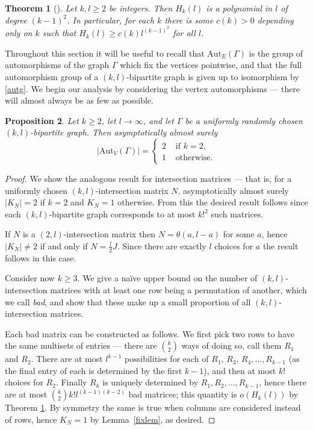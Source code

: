 \documentclass{daj}
\newcommand\Aut{\mathrm{Aut}}
\theoremstyle{plain}
\newtheorem{theorem}{Theorem}[section]
\newtheorem{proposition}[theorem]{Proposition}
\theoremstyle{definition}
\begin{document}
\begin{theorem}[\cite{stanley}]\label{iklsize}
Let $k,l\geq2$ be integers. Then $H_k(l)$ is a polynomial in $l$ of degree $(k-1)^2$. In particular, for each $k$ there is some $c(k)>0$ depending only on $k$ such that $H_{k}(l)\geq c(k)l^{(k-1)^2}$ for all $l$.
\end{theorem}
Throughout this section it will be useful to recall that $\Aut_E(\Gamma)$ is the group of automorphisms of the graph $\Gamma$ which fix the vertices pointwise, and that the full automorphism group of a $(k,l)$-bipartite graph is given up to isomorphism by \eqref{autg}. We begin our analysis by considering the vertex automorphisms --- there will almost always be as few as possible.
\begin{proposition}\label{trivverts}
Let $k\geq 2$, let $l\to\infty$, and let $\Gamma$ be a uniformly randomly chosen $(k,l)$-bipartite graph. Then asymptotically almost surely $$|\Aut_V(\Gamma)|=\begin{cases}2&\text{ if $k=2$,}\\
1&\text{ otherwise.}\end{cases}$$
\end{proposition}
\begin{proof}
We show the analogous result for intersection matrices --- that is, for a uniformly chosen $(k,l)$-intersection matrix $N$, asymptotically almost surely $|K_N|=2$ if $k=2$ and $K_N=1$ otherwise. From this the desired result follows since each $(k,l)$-bipartite graph corresponds to at most $k!^2$ such matrices. 

If $N$ is a $(2,l)$-intersection matrix then $N=\theta(a,l-a)$ for some $a$, hence $|K_N|\ne 2$ if and only if $N=\frac{l}{2}J$. Since there are exactly $l$ choices for $a$ the result follows in this case. 


Consider now $k\geq 3$. We give a na\"ive upper bound on the number of $(k,l)$-intersection matrices with at least one row being a permutation of another, which we call \emph{bad}, and show that these make up a small proportion of all $(k,l)$-intersection matrices.

Each bad matrix can be constructed as follows. We first pick two rows to have the same multisets of entries --- there are ${k\choose 2}$ ways of doing so, call them $R_1$ and $R_2$. There are at most $l^{k-1}$ possibilities for each of $R_1$, $R_3$, $R_4,\dots, R_{k-1}$ (as the final entry of each is determined by the first $k-1$), and then at most $k!$ choices for $R_2$. Finally $R_{k}$ is uniquely determined by $R_1,R_2,\dots, R_{k-1}$, hence there are at most ${k\choose 2}k!l^{(k-1)(k-2)}$ bad matrices; this quantity is $o(H_k(l))$ by Theorem \ref{iklsize}. By symmetry the same is true when columns are considered instead of rows, hence $K_N=1$ by Lemma~\ref{fixlem}, as desired. 
\end{proof}
\end{document}
